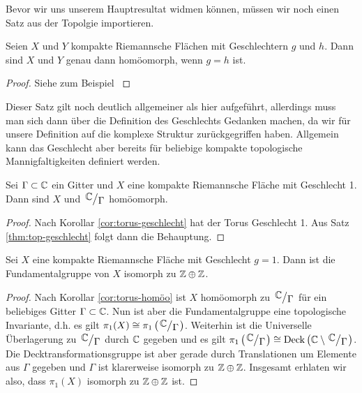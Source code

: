 Bevor wir uns unserem Hauptresultat widmen können, müssen wir noch
einen Satz aus der Topolgie importieren.

\begin{thm}
  \label{thm:top-geschlecht}
  Seien $X$ und $Y$ kompakte Riemannsche Flächen mit Geschlechtern $g$
  und $h$. Dann sind $X$ und $Y$ genau dann homöomorph, wenn $g = h$ ist.
\end{thm}

\begin{proof}
  Siehe zum Beispiel \cite[Korollar 2.4.A.2]{Jos}
\end{proof}

\begin{rem}
  Dieser Satz gilt noch deutlich allgemeiner als hier aufgeführt,
  allerdings muss man sich dann über die Definition des Geschlechts
  Gedanken machen, da wir für unsere Definition auf die
  komplexe Struktur zurückgegriffen haben. Allgemein kann das
  Geschlecht aber bereits für beliebige kompakte topologische
  Mannigfaltigkeiten definiert werden.
\end{rem}

\begin{cor}
  \label{cor:torus-homöo}
  Sei $\Gamma \subset \mathbb{C}$ ein Gitter und $X$ eine kompakte Riemannsche
  Fläche mit Geschlecht 1. Dann sind $X$ und $\quot{\C}{\Gamma}$ homöomorph.
\end{cor}

\begin{proof}
  Nach Korollar \ref{cor:torus-geschlecht} hat der Torus Geschlecht
  1. Aus Satz \ref{thm:top-geschlecht} folgt dann die Behauptung.
\end{proof}

\begin{thm}
  \label{thm:geschlecht-1-z}
  Sei $X$ eine kompakte Riemannsche Fläche mit Geschlecht $g =
  1$. Dann ist die Fundamentalgruppe von $X$ isomorph zu $\mathbb{Z} \oplus \mathbb{Z}$.
\end{thm}

\begin{proof}
  Nach Korollar \ref{cor:torus-homöo} ist $X$ homöomorph zu
  $\quot{\C}{\Gamma}$ für ein beliebiges Gitter $\Gamma \subset
  \mathbb{C}$. Nun ist aber die Fundamentalgruppe eine topologische
  Invariante, d.h. es gilt $\pi_1(X) \cong
  \pi_1\left(\quot{\C}{\Gamma}\right)$. Weiterhin ist die Universelle
  Überlagerung zu $\quot{\C}{\Gamma}$ durch $\mathbb{C}$ gegeben und es gilt $
  \pi_1\left (\quot{\C}{\Gamma}\right) \cong \Deck \left (\C \setminus
    \quot{\C}{\Gamma} \right )$. Die Decktransformationsgruppe ist
  aber gerade durch Translationen um Elemente aus $\Gamma$ gegeben und
  $\Gamma$ ist klarerweise isomorph zu $\mathbb{Z} \oplus \mathbb{Z}$. Insgesamt
  erhlaten wir also, dass $\pi_1(X)$ isomorph zu $\mathbb{Z} \oplus \mathbb{Z}$ ist.
\end{proof}

